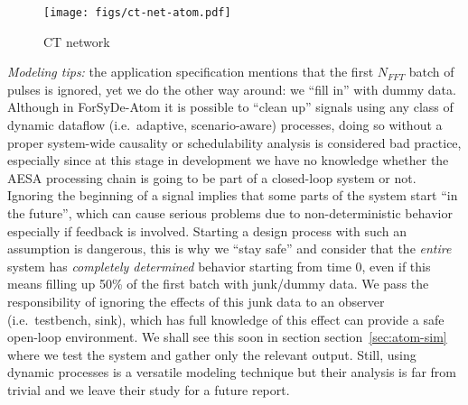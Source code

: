 \documentclass[
  a4paper,
]{article}
\begin{document}
\begin{figure}
\hypertarget{fig:ct-net-atom}{%
\centering
\texttt{[image: figs/ct-net-atom.pdf]}
\caption{CT network}\label{fig:ct-net-atom}
}
\end{figure}

\emph{Modeling tips:} the application specification mentions that the
first \(N_{FFT}\) batch of pulses is ignored, yet we do the other way
around: we ``fill in'' with dummy data. Although in ForSyDe-Atom it is
possible to ``clean up'' signals using any class of dynamic dataflow
(i.e.~adaptive, scenario-aware) processes, doing so without a proper
system-wide causality or schedulability analysis is considered bad
practice, especially since at this stage in development we have no
knowledge whether the AESA processing chain is going to be part of a
closed-loop system or not. Ignoring the beginning of a signal implies
that some parts of the system start ``in the future'', which can cause
serious problems due to non-deterministic behavior especially if
feedback is involved. Starting a design process with such an assumption
is dangerous, this is why we ``stay safe'' and consider that the
\emph{entire} system has \emph{completely determined} behavior starting
from time 0, even if this means filling up 50\% of the first batch with
junk/dummy data. We pass the responsibility of ignoring the effects of
this junk data to an observer (i.e.~testbench, sink), which has full
knowledge of this effect can provide a safe open-loop environment. We
shall see this soon in section section~\ref{sec:atom-sim} where we test
the system and gather only the relevant output. Still, using dynamic
processes is a versatile modeling technique but their analysis is far
from trivial and we leave their study for a future report.
\end{document}
